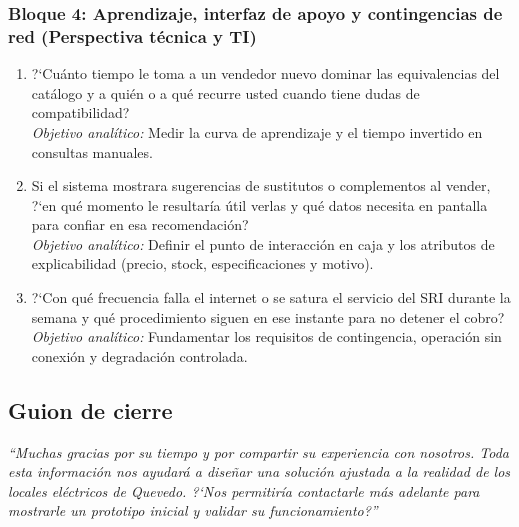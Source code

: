 \subsubsection*{Bloque 4: Aprendizaje, interfaz de apoyo y contingencias de red (Perspectiva t\'ecnica y TI)}
\begin{enumerate}[label=\textbf{P\arabic*.},resume,leftmargin=26pt,itemsep=3pt]
    \item ?`Cu\'anto tiempo le toma a un vendedor nuevo dominar las equivalencias del cat\'alogo y a qui\'en o a qu\'e recurre usted cuando tiene dudas de compatibilidad?\\
    {\footnotesize\textit{Objetivo anal\'itico:} Medir la curva de aprendizaje y el tiempo invertido en consultas manuales.}
    \item Si el sistema mostrara sugerencias de sustitutos o complementos al vender, ?`en qu\'e momento le resultar\'ia \'util verlas y qu\'e datos necesita en pantalla para confiar en esa recomendaci\'on?\\
    {\footnotesize\textit{Objetivo anal\'itico:} Definir el punto de interacci\'on en caja y los atributos de explicabilidad (precio, stock, especificaciones y motivo).}
    \item ?`Con qu\'e frecuencia falla el internet o se satura el servicio del SRI durante la semana y qu\'e procedimiento siguen en ese instante para no detener el cobro?\\
    {\footnotesize\textit{Objetivo anal\'itico:} Fundamentar los requisitos de contingencia, operaci\'on sin conexi\'on y degradaci\'on controlada.}
\end{enumerate}

\subsection{Guion de cierre}
\begin{tcolorbox}[colback=boxbg,colframe=uteqgreen,boxrule=0.7pt,arc=1.5mm,breakable]
\emph{\enquote{Muchas gracias por su tiempo y por compartir su experiencia con nosotros. Toda esta informaci\'on nos ayudar\'a a dise\~nar una soluci\'on ajustada a la realidad de los locales el\'ectricos de Quevedo. ?`Nos permitir\'ia contactarle m\'as adelante para mostrarle un prototipo inicial y validar su funcionamiento?}}
\end{tcolorbox}
